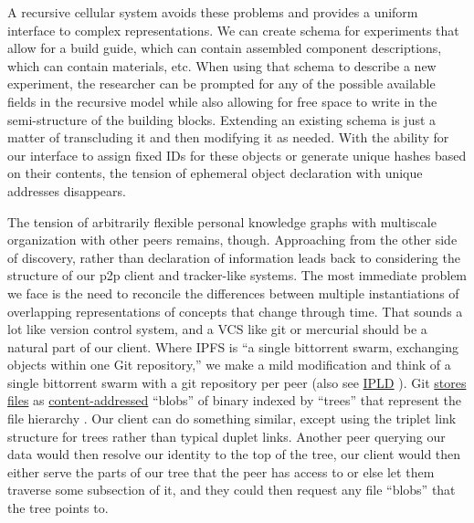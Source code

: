 A recursive cellular system avoids these problems and provides a uniform
interface to complex representations. We can create schema for
experiments that allow for a build guide, which can contain assembled
component descriptions, which can contain materials, etc. When using
that schema to describe a new experiment, the researcher can be prompted
for any of the possible available fields in the recursive model while
also allowing for free space to write in the semi-structure of the
building blocks. Extending an existing schema is just a matter of
transcluding it and then modifying it as needed. With the ability for
our interface to assign fixed IDs for these objects or generate unique
hashes based on their contents, the tension of ephemeral object
declaration with unique addresses disappears.

The tension of arbitrarily flexible personal knowledge graphs with
multiscale organization with other peers remains, though. Approaching
from the other side of discovery, rather than declaration of information
leads back to considering the structure of our p2p client and
tracker-like systems. The most immediate problem we face is the need to
reconcile the differences between multiple instantiations of overlapping
representations of concepts that change through time. That sounds a lot
like version control system, and a VCS like git or mercurial should be a
natural part of our client. Where IPFS is ``a single bittorrent swarm,
exchanging objects within one Git repository,'' \citep{benetIPFSContentAddressed2014}  we make a mild modification and think
of a single bittorrent swarm with a git repository per peer (also see
\href{https://ipld.io/docs/}{IPLD} \citep{protocollabsIPLDDocs2021} ). Git
\href{https://git-scm.com/book/en/v2/Git-Internals-Git-Objects}{stores
files} as
\href{https://en.wikipedia.org/wiki/Content-addressable_storage}{content-addressed}
``blobs'' of binary indexed by ``trees'' that represent the file
hierarchy \citep{chaconProGit2020} . Our client can do something
similar, except using the triplet link structure for trees rather than
typical duplet links. Another peer querying our data would then resolve
our identity to the top of the tree, our client would then either serve
the parts of our tree that the peer has access to or else let them
traverse some subsection of it, and they could then request any file
``blobs'' that the tree points to.

